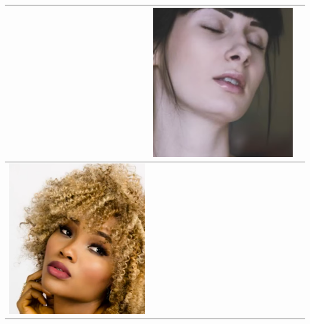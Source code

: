 \begin{table}[H]
\begin{tabular}{|c|c|c|}
\begin{minipage}{.29\textwidth}
  \end{minipage} & 
  \begin{minipage}{.29\textwidth}
    \includegraphics[width=\textwidth,height=\textheight,keepaspectratio]{images/match_other_1_res}
  \end{minipage} \\
    \hline
  \begin{minipage}{.29\textwidth}
    \includegraphics[width=\textwidth,height=\textheight,keepaspectratio]{images/match_other_2_orig}

\end{minipage}
\end{tabular}
\end{table}
